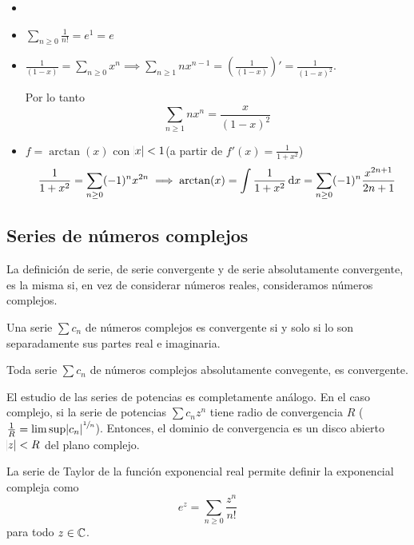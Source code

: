\begin{example*}
	\begin{itemize}
		\item[]
		\item $\displaystyle \sum_{n \geq 0} \frac{1}{n!} = e^1 = e$
		\item $\displaystyle \frac{1}{(1-x)} = \sum_{n \geq 0} x^n \implies
			\sum_{n \geq 1} n x^{n-1} = \left( \frac{1}{(1-x)} \right)' =
			\frac{1}{(1-x)^2}$.

			Por lo tanto
			\[
				\sum_{n \geq 1} nx^n = \frac{x}{(1-x)^2}
			\]
		\item $f = \arctan(x)$ con $\abs{x} < 1$(a partir de $f'(x) = \frac{1}{1+x^2}$)
			\[
				\frac{1}{1+x^2} = \sum_{n \geq 0} (-1)^n x^{2n} \implies
				\arctan(x) = \int \frac{1}{1+x^2} \dif x = \sum_{n \geq 0} (-1)^n
				\frac{x^{2n+1}}{2n+1}
			\]
	\end{itemize}
\end{example*}

\subsection{Series de números complejos}

\begin{defi*}
	La definición de serie, de serie convergente y de serie absolutamente convergente,
	es la misma si, en vez de considerar números reales, consideramos números
	complejos.
\end{defi*}

\begin{prop*}
	Una serie $\sum c_n$ de números complejos es convergente si y solo si lo son
	separadamente sus partes real e imaginaria.
\end{prop*}

\begin{prop*}
	Toda serie $\sum c_n$ de números complejos absolutamente convegente, es
	convergente.
\end{prop*}

\begin{obs*}
	El estudio de las series de potencias es completamente análogo. En el caso
	complejo, si la serie de potencias $\sum c_n z^n$ tiene radio de convergencia
	$R$ ($\frac{1}{R} = \limsup \abs{c_n}^{\sfrac{1}{n}}$). Entonces, el dominio de
	convergencia es un disco abierto $\abs{z} < R$ del plano complejo.
\end{obs*}

\begin{obs*}
	La serie de Taylor de la función exponencial real permite definir la exponencial
	compleja como
	\[
		e^z = \sum_{n \geq 0} \frac{z^n}{n!}
	\]
	para todo $z \in \mathbb{C}$.
\end{obs*}

